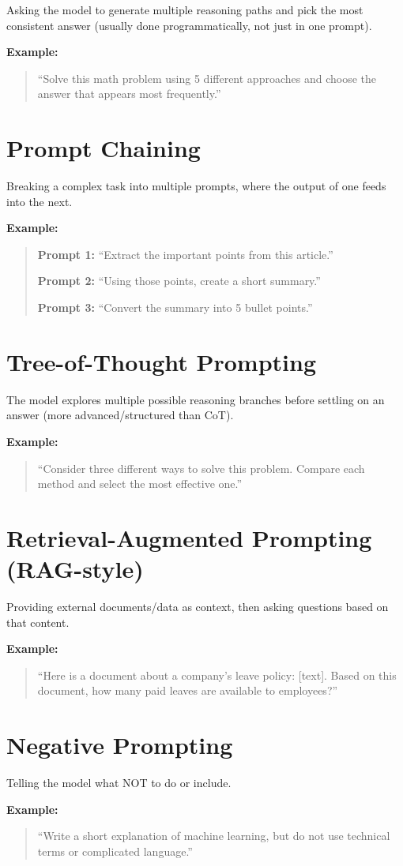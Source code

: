 \documentclass[12pt]{article}
\begin{document}
Asking the model to generate multiple reasoning paths and pick the most consistent answer (usually done programmatically, not just in one prompt).

\textbf{Example:}

\begin{quote}
``Solve this math problem using 5 different approaches and choose the answer that appears most frequently.''
\end{quote}


\section{Prompt Chaining}

Breaking a complex task into multiple prompts, where the output of one feeds into the next.

\textbf{Example:}

\begin{quote}
\textbf{Prompt 1:} ``Extract the important points from this article.''

\textbf{Prompt 2:} ``Using those points, create a short summary.''

\textbf{Prompt 3:} ``Convert the summary into 5 bullet points.''
\end{quote}


\section{Tree-of-Thought Prompting}

The model explores multiple possible reasoning branches before settling on an answer (more advanced/structured than CoT).

\textbf{Example:}

\begin{quote}
``Consider three different ways to solve this problem. Compare each method and select the most effective one.''
\end{quote}


\section{Retrieval-Augmented Prompting (RAG-style)}

Providing external documents/data as context, then asking questions based on that content.

\textbf{Example:}

\begin{quote}
``Here is a document about a company's leave policy: [text]. Based on this document, how many paid leaves are available to employees?''
\end{quote}


\section{Negative Prompting}

Telling the model what NOT to do or include.

\textbf{Example:}

\begin{quote}
``Write a short explanation of machine learning, but do not use technical terms or complicated language.''
\end{quote}
\end{document}
